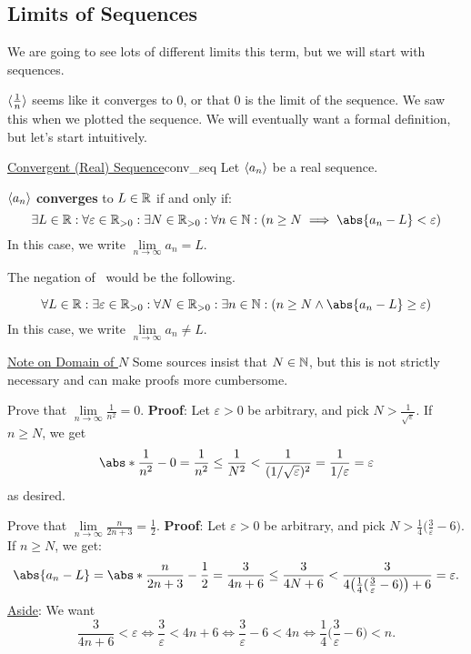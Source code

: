 \subsection{Limits of Sequences}
We are going to see lots of different limits this term, but we will start with sequences.
\begin{Example}{}{}
    $ \langle\frac{1}{n}\rangle $ seems like it converges to $ 0 $, or that $ 0 $ is the limit of the sequence.
    We saw this when we plotted the sequence. We will eventually want a formal definition, but let's start intuitively.
\end{Example}
\begin{Definition}{\href{https://proofwiki.org/wiki/Definition:Convergent_Sequence/Real_Numbers}{Convergent (Real) Sequence}}{conv_seq}
    Let $ \langle a_n\rangle $ be a real sequence.\bigskip

    $ \langle a_n\rangle $ \textbf{converges} to $ L\in\mathbb{R}$ if and only if:
    \[ \exists L\in\R:\forall \varepsilon\in\R_{>0}: \exists N\in \R_{>0}:\forall n\in\N:(n\ge N\implies \abs{a_n-L}<\varepsilon) \]
    In this case, we write $ \lim\limits_{{n} \to {\infty}}a_n=L $.
\end{Definition}
\begin{Remark}{}{}
    The negation of~ would be the following.\smallskip

    \[ \forall L\in\R:\exists \varepsilon\in\R_{>0}: \forall N\in \R_{>0}:\exists n\in\N:(n\ge N \land \abs{a_n-L}\ge \varepsilon) \]
    In this case, we write $ \lim\limits_{{n} \to {\infty}}a_n\ne L $.
\end{Remark}
\begin{Remark}{\href{https://proofwiki.org/wiki/Definition:Convergent_Sequence/Note_on_Domain_of_N}{Note on Domain of $ N $}}{}
    Some sources insist that $ N\in\mathbb{N} $, but this is not strictly necessary and can make proofs more cumbersome.
\end{Remark}
\begin{Example}{}{}
    Prove that $ \displaystyle \lim\limits_{{n} \to {\infty}}\frac{1}{n^2}=0 $.
    \tcblower{}
    \textbf{Proof}: Let $ \varepsilon>0 $ be arbitrary, and pick $ N>\frac{1}{\sqrt{\varepsilon}} $. If $ n\ge N $,
    we get
    \[ \abs*{\frac{1}{n^2}-0}=\frac{1}{n^2}\le \frac{1}{N^2}<\frac{1}{(1/\sqrt{\varepsilon})^2}=\frac{1}{1/\varepsilon}=\varepsilon \]
    as desired.
\end{Example}
\begin{Example}{}{}
    Prove that $ \displaystyle \lim\limits_{{n} \to {\infty}}\frac{n}{2n+3}=\frac{1}{2} $.
    \tcblower{}
    \textbf{Proof}: Let $ \varepsilon>0 $ be arbitrary, and pick $ N>\frac{1}{4}\bigl(\frac{3}{\varepsilon}-6\bigr) $.
    If $ n\ge N $, we get:
    \[ \abs{a_n-L}=\abs*{\frac{n}{2n+3}-\frac{1}{2}}=\frac{3}{4n+6}\le \frac{3}{4N+6}<\frac{3}{4\bigl(\frac{1}{4}(\frac{3}{\varepsilon}-6)\bigr)+6}=\varepsilon. \]
    \underline{Aside}: We want
    \[ \frac{3}{4n+6}<\varepsilon\iff \frac{3}{\varepsilon}<4n+6\iff \frac{3}{\varepsilon}-6<4n\iff \frac{1}{4}\biggl(\frac{3}{\varepsilon}-6\biggr)<n. \]
\end{Example}
